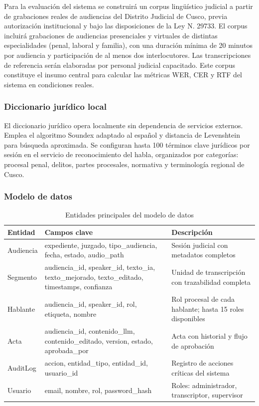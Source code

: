 \documentclass[12pt,a4paper,oneside]{article}
\begin{document}
Para la evaluaci\'on del sistema se construir\'a un corpus ling\"u\'istico judicial a partir de grabaciones reales de audiencias del Distrito Judicial de Cusco, previa autorizaci\'on institucional y bajo las disposiciones de la Ley N.\textordmasculine{} 29733. El corpus incluir\'a grabaciones de audiencias presenciales y virtuales de distintas especialidades (penal, laboral y familia), con una duraci\'on m\'inima de 20 minutos por audiencia y participaci\'on de al menos dos interlocutores. Las transcripciones de referencia ser\'an elaboradas por personal judicial capacitado. Este corpus constituye el insumo central para calcular las m\'etricas WER, CER y RTF del sistema en condiciones reales.

\subsubsection{Diccionario jur\'idico local}

El diccionario jur\'idico opera localmente sin dependencia de servicios externos. Emplea el algoritmo Soundex adaptado al espa\~nol y distancia de Levenshtein para b\'usqueda aproximada. Se configuran hasta 100 t\'erminos clave jur\'idicos por sesi\'on en el servicio de reconocimiento del habla, organizados por categor\'ias: procesal penal, delitos, partes procesales, normativa y terminolog\'ia regional de Cusco.

\subsubsection{Modelo de datos}

\begin{table}[H]
\centering
\small
\caption{Entidades principales del modelo de datos}
\begin{tabular}{|p{2.2cm}|p{4cm}|p{6.5cm}|}
\hline
\rowcolor{gray!20}
\textbf{Entidad} & \textbf{Campos clave} & \textbf{Descripci\'on} \\
\hline
Audiencia & expediente, juzgado, tipo\_audiencia, fecha, estado, audio\_path & Sesi\'on judicial con metadatos completos \\
\hline
Segmento & audiencia\_id, speaker\_id, texto\_ia, texto\_mejorado, texto\_editado, timestamps, confianza & Unidad de transcripci\'on con trazabilidad completa \\
\hline
Hablante & audiencia\_id, speaker\_id, rol, etiqueta, nombre & Rol procesal de cada hablante; hasta 15 roles disponibles \\
\hline
Acta & audiencia\_id, contenido\_llm, contenido\_editado, version, estado, aprobada\_por & Acta con historial y flujo de aprobaci\'on \\
\hline
AuditLog & accion, entidad\_tipo, entidad\_id, usuario\_id & Registro de acciones cr\'iticas del sistema \\
\hline
Usuario & email, nombre, rol, password\_hash & Roles: administrador, transcriptor, supervisor \\
\hline
\end{tabular}
\label{tab:modelo_datos}
\end{table}
\end{document}
